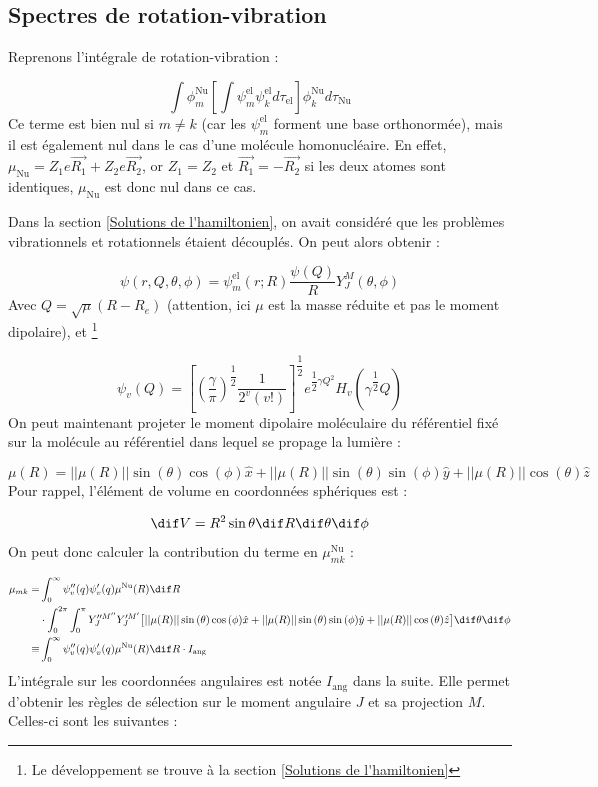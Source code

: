 \subsection{Spectres de rotation-vibration}

Reprenons l'intégrale de rotation-vibration :

\[
    \int \phi^\text{Nu}_m\left[\int \psi^\text{el}_m\psi^\text{el}_kd\tau_\text{el} \right]\phi^\text{Nu}_kd\tau_\text{Nu}
\]
Ce terme est bien nul si $m\neq k$ (car les $\psi^\text{el}_m$ forment une base orthonormée), mais il est également nul dans le cas d'une molécule homonucléaire. En effet, $\mu_\text{Nu} = Z_1e\Vec{R_1} + Z_2e\Vec{R_2}$, or $Z_1=Z_2$ et $\Vec{R_1}=-\Vec{R_2}$ si les deux atomes sont identiques, $\mu_\text{Nu}$ est donc nul dans ce cas.


Dans la section \ref{Solutions de l'hamiltonien}, on avait considéré que les problèmes vibrationnels et rotationnels étaient découplés. On peut alors obtenir :

\[
    \psi(r,Q,\theta,\phi) = \psi^\text{el}_m(r;R)\dfrac{\psi(Q)}{R}Y_J^M(\theta,\phi)
\]
Avec $Q = \sqrt{\mu}(R-R_e)$ (attention, ici $\mu$ est la masse réduite et pas le moment dipolaire), et \footnote{Le développement se trouve à la section \ref{Solutions de l'hamiltonien}}

\[
    \psi_v(Q) = \left[(\dfrac{\gamma}{\pi})^{\dfrac{1}{2}}\dfrac{1}{2^v(v!)} \right]^{\dfrac{1}{2}}e^{\dfrac{1}{2}\gamma Q^2}H_v(\gamma^{\dfrac{1}{2}}Q)
\]
On peut maintenant projeter le moment dipolaire moléculaire du référentiel fixé sur la molécule au référentiel dans lequel se propage la lumière :

\[
    \mu(R) = ||\mu(R)||\sin{(\theta)}\cos{(\phi)}\hat{x} + ||\mu(R)||\sin{(\theta)}\sin{(\phi)}\hat{y} +||\mu(R)||\cos{(\theta)}\hat{z}
\]
Pour rappel, l'élément de volume en coordonnées sphériques est :

\[ \dif V = R^2\sin{\theta}\dif R\dif\theta \dif\phi \]
On peut donc calculer la contribution du terme en $\mu^\text{Nu}_{mk}$ :

\begin{align*}
    \mu_{mk} =& \int^{\infty}_0\psi_v''(q)\psi_v'(q)\mu^\text{Nu}(R)\dif R \\
    & \cdot \int^{2\pi}_0\int^{\pi}_0 Y_J''^{M''}Y_J'^{M'}   \big[||\mu(R)||\sin{(\theta)}\cos{(\phi)}\hat{x} + ||\mu(R)||\sin{(\theta)}\sin{(\phi)}\hat{y} +||\mu(R)||\cos{(\theta)}\hat{z}   \big]\dif\theta \dif\phi \\ 
    \equiv & \int^{\infty}_0\psi_v''(q)\psi_v'(q)\mu^\text{Nu}(R)\dif R \cdot I_\text{ang}
\end{align*}
L'intégrale sur les coordonnées angulaires est notée $I_\text{ang}$ dans la suite. Elle permet d'obtenir les règles de sélection sur le moment angulaire $J$ et sa projection $M$. Celles-ci sont les suivantes :

